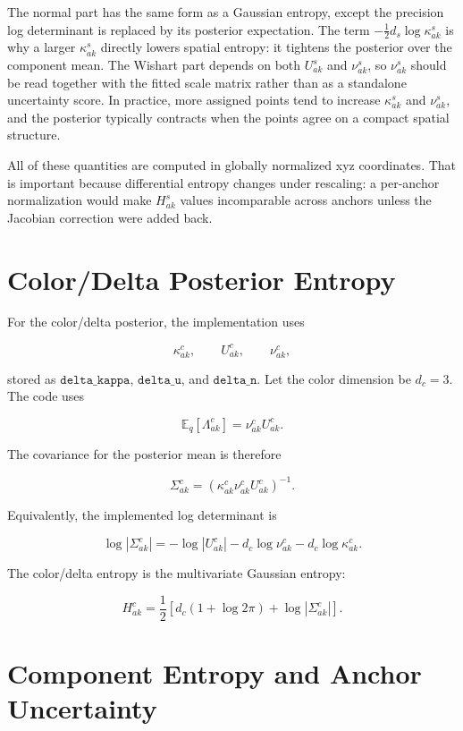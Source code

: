 \documentclass[11pt]{article}
\newcommand{\E}{\mathbb{E}}
\begin{document}
The normal part has the same form as a Gaussian entropy, except the precision
log determinant is replaced by its posterior expectation. The term
\(-\frac{1}{2}d_s\log \kappa^s_{ak}\) is why a larger \(\kappa^s_{ak}\)
directly lowers spatial entropy: it tightens the posterior over the component
mean. The Wishart part depends on both \(U^s_{ak}\) and \(\nu^s_{ak}\), so
\(\nu^s_{ak}\) should be read together with the fitted scale matrix rather
than as a standalone uncertainty score. In practice, more assigned points tend
to increase \(\kappa^s_{ak}\) and \(\nu^s_{ak}\), and the posterior typically
contracts when the points agree on a compact spatial structure.

All of these quantities are computed in globally normalized xyz coordinates.
That is important because differential entropy changes under rescaling: a
per-anchor normalization would make \(H^s_{ak}\) values incomparable across
anchors unless the Jacobian correction were added back.

\section{Color/Delta Posterior Entropy}

For the color/delta posterior, the implementation uses

\[
  \kappa^c_{ak},
  \qquad
  U^c_{ak},
  \qquad
  \nu^c_{ak},
\]

stored as \(\texttt{delta\_kappa}\), \(\texttt{delta\_u}\), and
\(\texttt{delta\_n}\). Let the color dimension be \(d_c = 3\). The code uses

\[
  \E_q[\Lambda^c_{ak}]
  =
  \nu^c_{ak} U^c_{ak}.
\]

The covariance for the posterior mean is therefore

\[
  \Sigma^c_{ak}
  =
  \left(
    \kappa^c_{ak}\nu^c_{ak}U^c_{ak}
  \right)^{-1}.
\]

Equivalently, the implemented log determinant is

\[
  \log |\Sigma^c_{ak}|
  =
  -\log |U^c_{ak}|
  -
  d_c\log \nu^c_{ak}
  -
  d_c\log \kappa^c_{ak}.
\]

The color/delta entropy is the multivariate Gaussian entropy:

\[
  H^c_{ak}
  =
  \frac{1}{2}
  \left[
    d_c(1 + \log 2\pi)
    +
    \log |\Sigma^c_{ak}|
  \right].
\]

\section{Component Entropy and Anchor Uncertainty}
\end{document}
